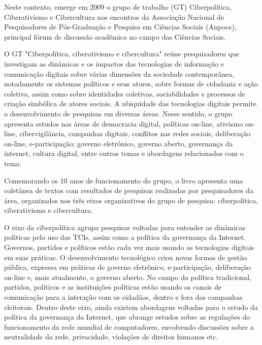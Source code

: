 Neste contexto, emerge em 2009 o grupo de trabalho (GT) Ciberpolítica,
Ciberativismo e Cibercultura nos encontros da Associação Nacional de
Pesquisadores de Pós-Graduação e Pesquisa em Ciências Sociais (Anpocs),
principal fórum de discussão acadêmica no campo das Ciências Sociais.

O GT "Ciberpolítica, ciberativismo e cibercultura" reúne pesquisadores
que investigam as dinâmicas e os impactos das tecnologias de informação
e comunicação digitais sobre várias dimensões da sociedade
contemporânea, notadamente os sistemas políticos e seus atores, sobre
formas de cidadania e ação coletiva, assim como sobre identidades
coletivas, sociabilidades e processos de criação simbólica de atores
sociais. A ubiquidade das tecnologias digitais permite o desenvolvimento
de pesquisas em diversas áreas. Nesse sentido, o grupo apresenta estudos
nas áreas de democracia digital, políticas on-line, ativismo on-line,
cibervigilância, campanhas digitais, conflitos nas redes sociais,
deliberação on-line, e-participação; governo eletrônico, governo aberto,
governança da internet, cultura digital, entre outros temas e abordagens
relacionados com o tema.

Comemorando os 10 anos de funcionamento do grupo, o livro apresenta uma
coletânea de textos com resultados de pesquisas realizadas por
pesquisadores da área, organizados nos três eixos organizativos do grupo
de pesquisa: ciberpolítica, ciberativismo e cibercultura.

O eixo da ciberpolítica agrupa pesquisas voltadas para entender as
dinâmicas políticas pelo uso das TCIs, assim como a política da
governança da Internet. Governos, partidos e políticos estão cada vez
mais usando as tecnologias digitais em suas práticas. O desenvolvimento
tecnológico criou novas formas de gestão pública, expressa em práticas
de governo eletrônico, e-participação, deliberação on-line e, mais
atualmente, o governo aberto. No campo da política tradicional,
partidos, políticos e as instituições políticas estão usando os canais
de comunicação para a interação com os cidadãos, dentro e fora das
campanhas eleitorais. Dentro deste eixo, ainda existem abordagens
voltadas para o estudo da política da governança da Internet, que
abrange estudos sobre as regulações do funcionamento da rede mundial de
computadores, envolvendo discussões sobre a neutralidade da rede,
privacidade, violações de direitos humanos etc.

